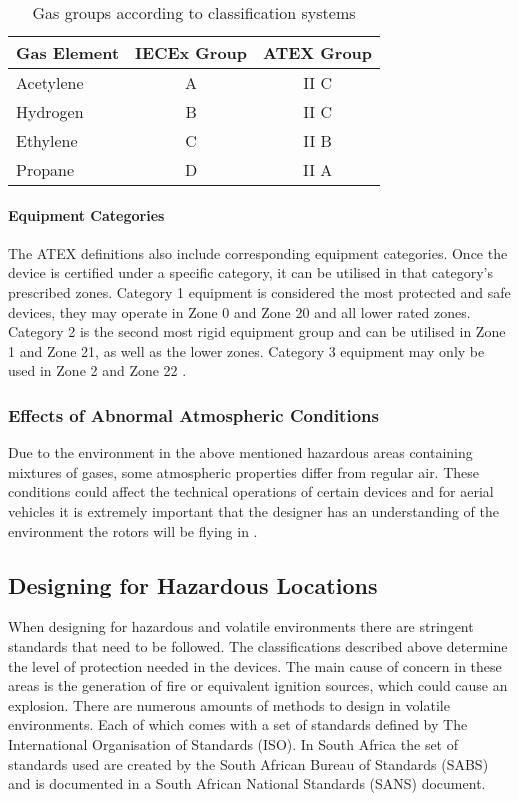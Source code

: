 \begin{table}[!]
\centering
\begin{tabular}{l | c | c}

Gas Element & IECEx Group & ATEX Group\\
\hline\hline
Acetylene & A & II C\\
Hydrogen & B & II C\\
Ethylene & C & II B\\
Propane & D &  II A\\

\end{tabular}

\caption{Gas groups according to classification systems}
\end{table}

\paragraph{Equipment Categories}
The ATEX definitions also include corresponding equipment categories. Once the device is certified under a specific category, it can be utilised in that category's prescribed zones. Category 1 equipment is considered the most protected and safe devices, they may operate in Zone 0 and Zone 20 and all lower rated zones. Category 2 is the second most rigid equipment group and can be utilised in Zone 1 and Zone 21, as well as the lower zones. Category 3  equipment may only be used in Zone 2 and Zone 22 \cite{ATEX, SANS}.



\subsubsection{Effects of Abnormal Atmospheric Conditions}
Due to the environment in the above mentioned hazardous areas containing mixtures of gases, some atmospheric properties differ from regular air. These conditions could affect the technical operations of certain devices \cite{HC} and for aerial vehicles it is extremely important that the designer has an understanding of the environment the rotors will be flying in \cite{Leishman}. 



\subsection{Designing for Hazardous Locations}
When designing for hazardous and volatile environments there are stringent standards that need to be followed. The classifications described above determine the level of protection needed in the devices. The main cause of concern in these areas is the generation of fire or equivalent ignition sources, which could cause an explosion.
There are numerous amounts of methods to design in volatile environments. Each of which comes with a set of standards defined by The International Organisation of Standards (ISO). In South Africa the set of standards used are created by the South African Bureau of Standards (SABS) and is documented in a South African National Standards (SANS) document.

